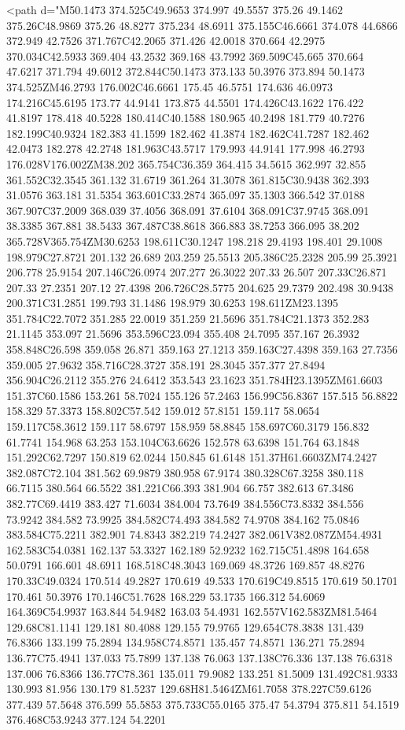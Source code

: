 <path d="M50.1473 374.525C49.9653 374.997 49.5557 375.26 49.1462 375.26C48.9869 375.26 48.8277 375.234 48.6911 375.155C46.6661 374.078 44.6866 372.949 42.7526 371.767C42.2065 371.426 42.0018 370.664 42.2975 370.034C42.5933 369.404 43.2532 369.168 43.7992 369.509C45.665 370.664 47.6217 371.794 49.6012 372.844C50.1473 373.133 50.3976 373.894 50.1473 374.525ZM46.2793 176.002C46.6661 175.45 46.5751 174.636 46.0973 174.216C45.6195 173.77 44.9141 173.875 44.5501 174.426C43.1622 176.422 41.8197 178.418 40.5228 180.414C40.1588 180.965 40.2498 181.779 40.7276 182.199C40.9324 182.383 41.1599 182.462 41.3874 182.462C41.7287 182.462 42.0473 182.278 42.2748 181.963C43.5717 179.993 44.9141 177.998 46.2793 176.028V176.002ZM38.202 365.754C36.359 364.415 34.5615 362.997 32.855 361.552C32.3545 361.132 31.6719 361.264 31.3078 361.815C30.9438 362.393 31.0576 363.181 31.5354 363.601C33.2874 365.097 35.1303 366.542 37.0188 367.907C37.2009 368.039 37.4056 368.091 37.6104 368.091C37.9745 368.091 38.3385 367.881 38.5433 367.487C38.8618 366.883 38.7253 366.095 38.202 365.728V365.754ZM30.6253 198.611C30.1247 198.218 29.4193 198.401 29.1008 198.979C27.8721 201.132 26.689 203.259 25.5513 205.386C25.2328 205.99 25.3921 206.778 25.9154 207.146C26.0974 207.277 26.3022 207.33 26.507 207.33C26.871 207.33 27.2351 207.12 27.4398 206.726C28.5775 204.625 29.7379 202.498 30.9438 200.371C31.2851 199.793 31.1486 198.979 30.6253 198.611ZM23.1395 351.784C22.7072 351.285 22.0019 351.259 21.5696 351.784C21.1373 352.283 21.1145 353.097 21.5696 353.596C23.094 355.408 24.7095 357.167 26.3932 358.848C26.598 359.058 26.871 359.163 27.1213 359.163C27.4398 359.163 27.7356 359.005 27.9632 358.716C28.3727 358.191 28.3045 357.377 27.8494 356.904C26.2112 355.276 24.6412 353.543 23.1623 351.784H23.1395ZM61.6603 151.37C60.1586 153.261 58.7024 155.126 57.2463 156.99C56.8367 157.515 56.8822 158.329 57.3373 158.802C57.542 159.012 57.8151 159.117 58.0654 159.117C58.3612 159.117 58.6797 158.959 58.8845 158.697C60.3179 156.832 61.7741 154.968 63.253 153.104C63.6626 152.578 63.6398 151.764 63.1848 151.292C62.7297 150.819 62.0244 150.845 61.6148 151.37H61.6603ZM74.2427 382.087C72.104 381.562 69.9879 380.958 67.9174 380.328C67.3258 380.118 66.7115 380.564 66.5522 381.221C66.393 381.904 66.757 382.613 67.3486 382.77C69.4419 383.427 71.6034 384.004 73.7649 384.556C73.8332 384.556 73.9242 384.582 73.9925 384.582C74.493 384.582 74.9708 384.162 75.0846 383.584C75.2211 382.901 74.8343 382.219 74.2427 382.061V382.087ZM54.4931 162.583C54.0381 162.137 53.3327 162.189 52.9232 162.715C51.4898 164.658 50.0791 166.601 48.6911 168.518C48.3043 169.069 48.3726 169.857 48.8276 170.33C49.0324 170.514 49.2827 170.619 49.533 170.619C49.8515 170.619 50.1701 170.461 50.3976 170.146C51.7628 168.229 53.1735 166.312 54.6069 164.369C54.9937 163.844 54.9482 163.03 54.4931 162.557V162.583ZM81.5464 129.68C81.1141 129.181 80.4088 129.155 79.9765 129.654C78.3838 131.439 76.8366 133.199 75.2894 134.958C74.8571 135.457 74.8571 136.271 75.2894 136.77C75.4941 137.033 75.7899 137.138 76.063 137.138C76.336 137.138 76.6318 137.006 76.8366 136.77C78.361 135.011 79.9082 133.251 81.5009 131.492C81.9333 130.993 81.956 130.179 81.5237 129.68H81.5464ZM61.7058 378.227C59.6126 377.439 57.5648 376.599 55.5853 375.733C55.0165 375.47 54.3794 375.811 54.1519 376.468C53.9243 377.124 54.2201 